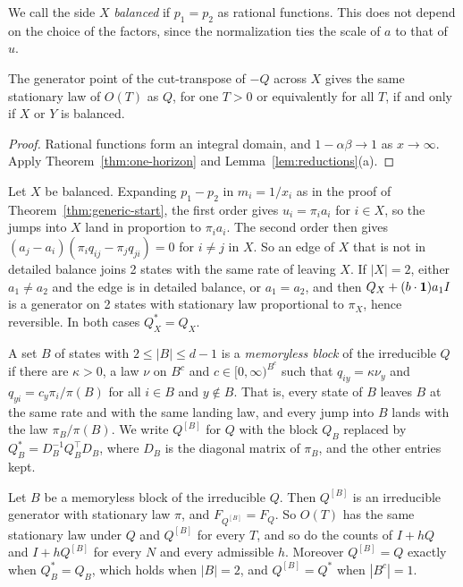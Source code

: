 We call the side $X$ \emph{balanced} if $p_1=p_2$ as rational functions. This does not depend on
the choice of the factors, since the normalization ties the scale of $a$ to that of $u$.

\begin{corollary}\label{cor:balance}
The generator point of the cut-transpose of $-Q$ across $X$ gives the same stationary law of
$O(T)$ as $Q$, for one $T>0$ or equivalently for all $T$, if and only if $X$ or $Y$ is balanced.
\end{corollary}

\begin{proof}
Rational functions form an integral domain, and $1-\alpha\beta\to1$ as $x\to\infty$. Apply
Theorem~\ref{thm:one-horizon} and Lemma~\ref{lem:reductions}(a).
\end{proof}

\begin{remark}\label{rem:balance-necessary}
Let $X$ be balanced. Expanding $p_1-p_2$ in $m_i=1/x_i$ as in the proof of
Theorem~\ref{thm:generic-start}, the first order gives $u_i=\pi_ia_i$ for $i\in X$, so the jumps
into $X$ land in proportion to $\pi_ia_i$. The second order then gives
$(a_j-a_i)(\pi_iq_{ij}-\pi_jq_{ji})=0$ for $i\ne j$ in $X$. So an edge of $X$ that is not in
detailed balance joins 2 states with the same rate of leaving $X$. If $|X|=2$, either $a_1\ne a_2$
and the edge is in detailed balance, or $a_1=a_2$, and then $Q_X+(b\cdot\mathbf{1})a_1I$ is a
generator on 2 states with stationary law proportional to $\pi_X$, hence reversible. In both cases
$Q^*_X=Q_X$.
\end{remark}

\begin{definition}\label{def:memoryless}
A set $B$ of states with $2\le|B|\le d-1$ is a \emph{memoryless block} of the irreducible $Q$ if
there are $\kappa>0$, a law $\nu$ on $B^c$ and $c\in[0,\infty)^{B^c}$ such that
$q_{iy}=\kappa\nu_y$ and $q_{yi}=c_y\pi_i/\pi(B)$ for all $i\in B$ and $y\notin B$. That is, every
state of $B$ leaves $B$ at the same rate and with the same landing law, and every jump into $B$
lands with the law $\pi_B/\pi(B)$. We write $Q^{[B]}$ for $Q$ with the block $Q_B$ replaced by
$Q^*_B=D_B^{-1}Q_B^\top D_B$, where $D_B$ is the diagonal matrix of $\pi_B$, and the other entries
kept.
\end{definition}

\begin{theorem}\label{thm:memoryless}
Let $B$ be a memoryless block of the irreducible $Q$. Then $Q^{[B]}$ is an irreducible generator
with stationary law $\pi$, and $F_{Q^{[B]}}=F_Q$. So $O(T)$ has the same stationary law under $Q$
and $Q^{[B]}$ for every $T$, and so do the counts of $I+hQ$ and $I+hQ^{[B]}$ for every $N$ and every
admissible $h$. Moreover $Q^{[B]}=Q$ exactly when $Q^*_B=Q_B$, which holds when $|B|=2$, and
$Q^{[B]}=Q^*$ when $|B^c|=1$.
\end{theorem}

